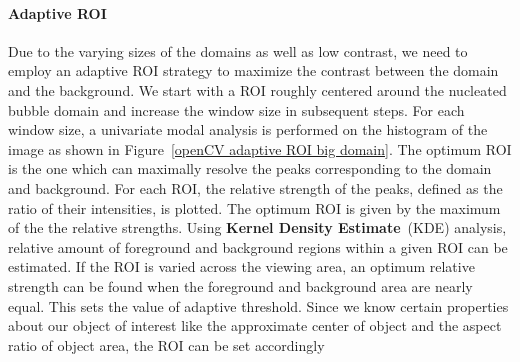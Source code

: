 \documentclass[12pt, twoside, a4paper]{article}
\begin{document}
\paragraph{Adaptive ROI}
Due to the varying sizes of the domains as well as low contrast, we need to employ an adaptive ROI strategy to maximize the contrast between the domain and the background. We start with a ROI roughly centered around the nucleated bubble domain and increase the window size in subsequent steps. For each window size, a univariate modal analysis is performed on the histogram of the image as shown in Figure~\ref{openCV adaptive ROI big domain}. The optimum ROI is the one which can maximally resolve the peaks corresponding to the domain and background. For each ROI, the relative strength of the peaks, defined as the ratio of their intensities, is plotted. The optimum ROI is given by the maximum of the the relative strengths.
%
Using \textbf{Kernel Density Estimate}~(KDE) analysis, relative amount of foreground and background regions within a given ROI can be estimated. If the ROI is varied across the viewing area, an optimum relative strength can be found when the foreground and background area are nearly equal. This sets the value of adaptive threshold.
%
Since we know certain properties about our object of interest like the approximate center of object and the aspect ratio of object area, the ROI can be set accordingly
%
\end{document}
